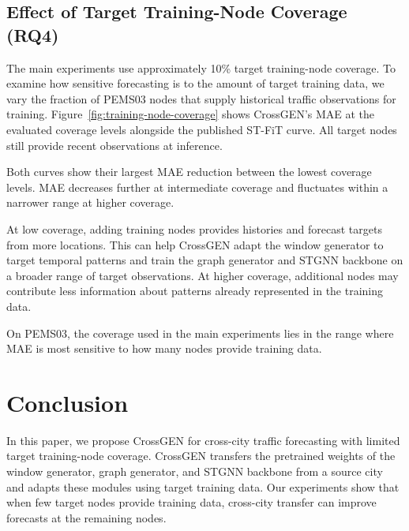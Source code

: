 \documentclass[runningheads,a4paper]{llncs}
\begin{document}
\subsection[Effect of Target Training-Node Coverage]{Effect of Target Training-Node Coverage (RQ4)}
\label{sec:training-node-coverage}



The main experiments use approximately 10\% target training-node coverage. To examine how sensitive forecasting is to the amount of target training data, we vary the fraction of PEMS03 nodes that supply historical traffic observations for training. Figure~\ref{fig:training-node-coverage} shows CrossGEN's MAE at the evaluated coverage levels alongside the published ST-FiT curve. All target nodes still provide recent observations at inference.

Both curves show their largest MAE reduction between the lowest coverage levels. MAE decreases further at intermediate coverage and fluctuates within a narrower range at higher coverage.

At low coverage, adding training nodes provides histories and forecast targets from more locations. This can help CrossGEN adapt the window generator to target temporal patterns and train the graph generator and STGNN backbone on a broader range of target observations. At higher coverage, additional nodes may contribute less information about patterns already represented in the training data.

On PEMS03, the coverage used in the main experiments lies in the range where MAE is most sensitive to how many nodes provide training data.

\section{ Conclusion}\label{sec:discussion}

In this paper, we propose CrossGEN for cross-city traffic forecasting with limited target training-node coverage.
CrossGEN transfers the pretrained weights of the window generator, graph generator, and STGNN backbone from a source city and adapts these modules using target training data.
Our experiments show that when few target nodes provide training data, cross-city transfer can improve forecasts at the remaining nodes.



\label{sec:conclusion}

%
\end{document}
